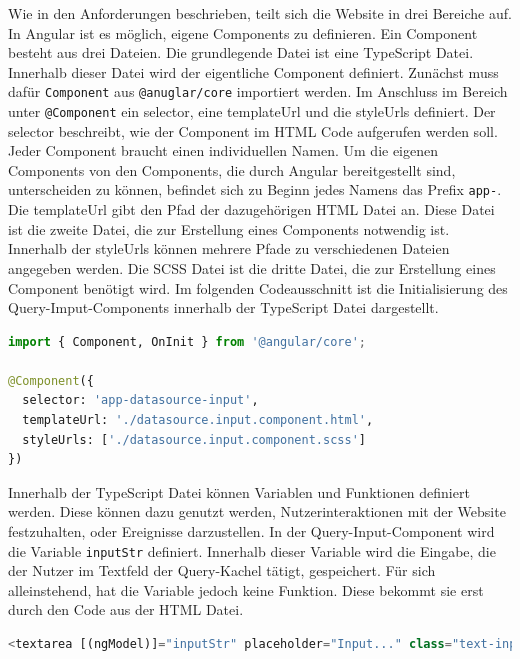 Wie in den Anforderungen beschrieben, teilt sich die Website in drei Bereiche auf. In Angular ist es möglich, eigene Components zu definieren. Ein Component besteht aus drei Dateien. Die grundlegende Datei ist eine TypeScript Datei. Innerhalb dieser Datei wird der eigentliche Component definiert. Zunächst muss dafür \texttt{Component} aus \texttt{@anuglar/core} importiert werden. Im Anschluss im Bereich unter \texttt{@Component} ein selector, eine templateUrl und die styleUrls definiert. Der selector beschreibt, wie der Component im HTML Code aufgerufen werden soll. Jeder Component braucht einen individuellen Namen. Um die eigenen Components von den Components, die durch Angular bereitgestellt sind, unterscheiden zu können, befindet sich zu Beginn jedes Namens das Prefix \texttt{app-}. Die templateUrl gibt den Pfad der dazugehörigen HTML Datei an. Diese Datei ist die zweite Datei, die zur Erstellung eines Components notwendig ist. Innerhalb der styleUrls können mehrere Pfade zu verschiedenen Dateien angegeben werden. Die SCSS Datei ist die dritte Datei, die zur Erstellung eines Component benötigt wird. Im folgenden Codeausschnitt ist die Initialisierung des Query-Imput-Components innerhalb der TypeScript Datei dargestellt.

\begin{lstlisting}[language=Python, caption={Definition eines Components}]
import { Component, OnInit } from '@angular/core';

@Component({
  selector: 'app-datasource-input',
  templateUrl: './datasource.input.component.html',
  styleUrls: ['./datasource.input.component.scss']
})
\end{lstlisting}

Innerhalb der TypeScript Datei können Variablen und Funktionen definiert werden. Diese können dazu genutzt werden, Nutzerinteraktionen mit der Website festzuhalten, oder Ereignisse darzustellen. In der Query-Input-Component wird die Variable \texttt{inputStr} definiert. Innerhalb dieser Variable wird die Eingabe, die der Nutzer im Textfeld der Query-Kachel tätigt, gespeichert. Für sich alleinstehend, hat die Variable jedoch keine Funktion. Diese bekommt sie erst durch den Code aus der HTML Datei. 

\begin{lstlisting}[language=Python, caption={Erstellung einer Textarea innerhalb der HTML-Datei}]
<textarea [(ngModel)]="inputStr" placeholder="Input..." class="text-input"></textarea>
\end{lstlisting}

